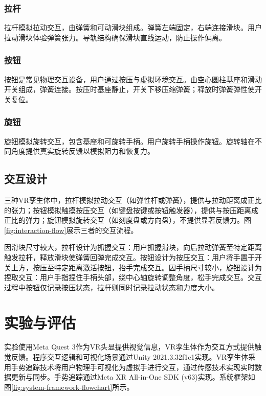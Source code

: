 \documentclass[runningheads]{llncs}
\begin{document}
\subsubsection{拉杆}
拉杆模拟拉动交互，由弹簧和可动滑块组成。弹簧左端固定，右端连接滑块。用户拉动滑块体验弹簧张力。导轨结构确保滑块直线运动，防止操作偏离。

\subsubsection{按钮}
按钮是常见物理交互设备，用户通过按压与虚拟环境交互。由空心圆柱基座和滑动开关组成，弹簧连接。按压时基座静止，开关下移压缩弹簧；释放时弹簧弹性使开关复位。

\subsubsection{旋钮}
旋钮模拟旋转交互，包含基座和可旋转手柄。用户旋转手柄操作旋钮。旋转轴在不同角度提供真实旋转反馈以模拟阻力和恢复力。

\subsection{交互设计}
三种VR孪生体中，拉杆模拟拉动交互（如弹性杆或弹簧），提供与拉动距离成正比的张力；按钮模拟触摸按压交互（如键盘按键或按钮触发器），提供与按压距离成正比的弹力；旋钮模拟旋转交互（如刻度盘或方向盘），不提供显著反馈力。图\ref{fig:interaction-flow}展示三者的交互流程。

因滑块尺寸较大，拉杆设计为抓握交互：用户抓握滑块，向后拉动弹簧至特定距离触发拉杆，释放滑块使弹簧回弹完成交互。按钮设计为按压交互：用户将手置于开关上方，按压至特定距离激活按钮，抬手完成交互。因手柄尺寸较小，旋钮设计为捏取交互：用户手指捏住手柄头部，绕中心轴旋转调整角度，松手完成交互。交互过程中按钮仅记录按压状态，拉杆则同时记录拉动状态和力度大小。

\section{实验与评估}
实验使用Meta Quest 3作为VR头显提供视觉信息，VR孪生体作为交互方式提供触觉反馈。程序交互逻辑和可视化场景通过Unity 2021.3.32f1c1实现。VR孪生体采用手势追踪技术将用户物理手可视化为虚拟手进行交互，通过传感技术实现实时数据更新与同步。手势追踪通过Meta XR All-in-One SDK (v63)实现。系统框架如图\ref{fig:system-framework-flowchart}所示。
\end{document}
